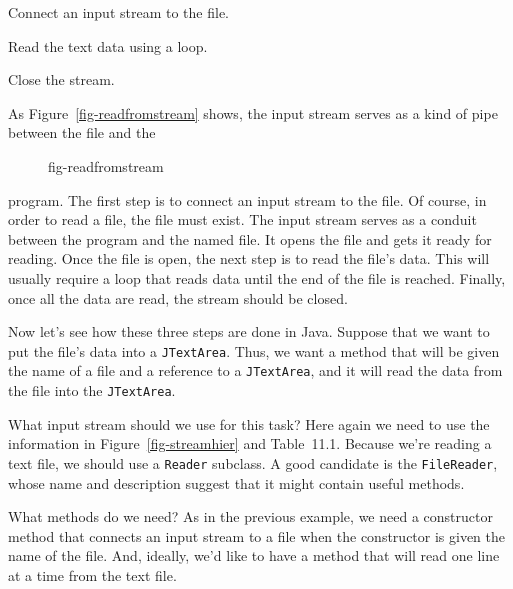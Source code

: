 \begin{NL}
\item  Connect an input stream to the file.

\item  Read the text data using a loop.

\item  Close the stream.
\end{NL}

\noindent As Figure~\ref{fig-readfromstream} shows, the
input stream serves as a kind of pipe between the file and the
\begin{figure}[h]
{fig-readfromstream}
\end{figure}
program.  The first step is to connect an input stream to the file.
Of course, in order to read a file, the file must exist.  The input
stream serves as a conduit between the program and the named file.  It
opens the file and gets it ready for reading.  Once the file is open,
the next step is to read the file's data.  This will usually require a
loop that reads data until the end of the file is reached.  Finally,
once all the data are read, the stream should be closed.



\noindent Now let's see how these three steps are done in Java.  Suppose
that we want to put the file's data into a {\tt JTextArea}. Thus, we
want a method that will be given the name of a file and a
reference to a {\tt JTextArea}, and it will read the data
from the file into the {\tt JTextArea}.

What input stream should we use for this task?  Here again we
need to use the information in  Figure~\ref{fig-streamhier} and
Table~11.1. Because we're reading a text file,
we should use a {\tt Reader} subclass.  A good candidate is
the {\tt File\-Reader}, whose name and description suggest
that it might contain useful methods.

What methods do we need? As in the previous example, we need a
constructor method that connects an input stream to a file when the
constructor is given the 
name of the file.  And, ideally, we'd like to have a method that will
read one line at a time from the text file.  

